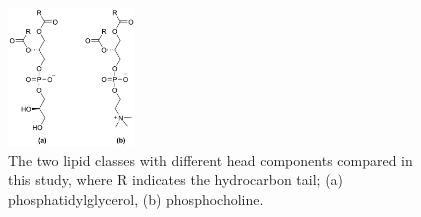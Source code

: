 \documentclass[twoside,twocolumn,9pt]{article}
\begin{document}
\begin{figure}
	\centering
	\includegraphics[width=0.30\textwidth]{figures/head_groups}
	\caption{The two lipid classes with different head components compared in this study, where R indicates the hydrocarbon tail; (a) phosphatidylglycerol, (b) phosphocholine.}
	\label{fig:heads}
\end{figure}
\end{document}
